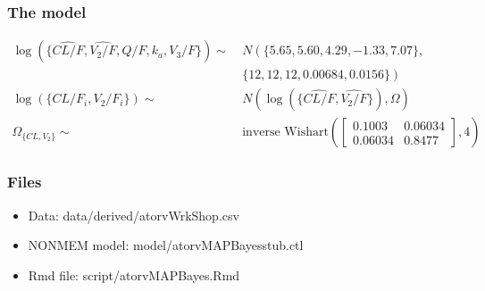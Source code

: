 \documentclass{beamer}
\begin{document}
\begin{frame}
  \frametitle{The model}

\begin{footnotesize}
  \begin{align*}
    \log\left(\{\widehat{CL/F}, \widehat{V_2/F}, Q/F, k_a,
    V_3/F\}\right) \sim\ &
                                                        N\left(\{5.65,
                                                        5.60, 4.29,
                                                        -1.33, 7.07\},\right. \\
                                                        & \left.\{12, 12, 12,
                                                        0.00684,
                                                        0.0156\}\right)
    \\
    \log\left(\{CL/F_i, V_2/F_i\}\right) \sim\ &
                                           N\left(\log\left(\{\widehat{CL/F},
                                           \widehat{V_2/F}\}\right),
                                           \Omega\right) \\
\Omega_{\{CL, V_2\}} \sim\ & \text{inverse Wishart}\left(\left[\begin{array}{cc}
                 0.1003 &  0.06034 \\
                  0.06034 &  0.8477
    \end{array}\right], 4\right)
  \end{align*}
\end{footnotesize}

\end{frame}

\begin{frame}
  \frametitle{Files}
  
  \begin{itemize}
  \item Data: data/derived/atorvWrkShop.csv
    \item NONMEM model: model/atorvMAPBayesstub.ctl
    \item Rmd file: script/atorvMAPBayes.Rmd
  \end{itemize}

\end{frame}

\end{document}
